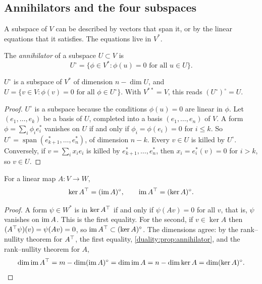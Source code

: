 \begin{notechapter}
\section{Annihilators and the four subspaces}\label{duality:sec:annihilators}

A subspace of $V$ can be described by vectors that span it, or by the
linear equations that it satisfies. The equations live in $V^*$.

\begin{definition}[Annihilator]\label{duality:def:annihilator}
The \emph{annihilator} of a subspace $U\subset V$ is
\[
  U^\circ = \{\phi\in V^* : \phi(u) = 0\text{ for all }u\in U\} .
\]
\end{definition}

\begin{proposition}
\label{duality:prop:annihilator}
$U^\circ$ is a subspace of $V^*$ of dimension $n - \dim U$, and
$U = \{v\in V : \phi(v) = 0\text{ for all }\phi\in U^\circ\}$. With
$V^{**} = V$, this reads $(U^\circ)^\circ = U$.
\end{proposition}

\begin{proof}
$U^\circ$ is a subspace because the conditions $\phi(u) = 0$ are linear in
$\phi$. Let $(e_1,\dots,e_k)$ be a basis of $U$, completed into a basis
$(e_1,\dots,e_n)$ of $V$. A form $\phi = \sum_i\phi_ie_i^*$ vanishes on
$U$ if and only if $\phi_i = \phi(e_i) = 0$ for $i\leq k$. So
$U^\circ = \operatorname{span}(e_{k+1}^*,\dots,e_n^*)$, of dimension
$n - k$. Every $v\in U$ is killed by $U^\circ$. Conversely, if
$v = \sum_ix_ie_i$ is killed by $e_{k+1}^*,\dots,e_n^*$, then
$x_i = e_i^*(v) = 0$ for $i > k$, so $v\in U$.
\end{proof}

\begin{theorem}\label{duality:thm:four}
For a linear map $A:V\to W$,
\[
  \ker A^{\top} = (\operatorname{im} A)^\circ ,
  \qquad
  \operatorname{im}A^{\top} = (\ker A)^\circ .
\]
\end{theorem}

\begin{proof}
A form $\psi\in W^*$ is in $\ker A^{\top}$ if and only if $\psi(Av) = 0$ for
all $v$, that is, $\psi$ vanishes on $\operatorname{im} A$. This is the first equality.
For the second, if $v\in\ker A$ then $(A^{\top}\psi)(v) = \psi(Av) = 0$, so
$\operatorname{im}A^{\top}\subset(\ker A)^\circ$. The dimensions agree: by the
rank--nullity theorem for $A^{\top}$, the first equality,
\cref{duality:prop:annihilator}, and the rank--nullity theorem for $A$,
\[
  \dim\operatorname{im}A^{\top} = m - \dim(\operatorname{im} A)^\circ = \dim\operatorname{im} A
  = n - \dim\ker A = \dim(\ker A)^\circ .
\qedhere
\]
\end{proof}


\end{notechapter}
